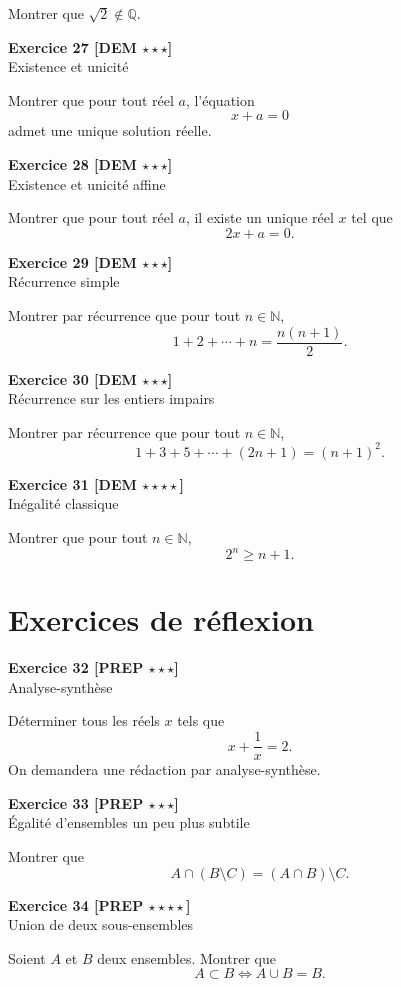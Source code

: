 \documentclass[11pt,a4paper]{article}
\newcommand{\N}{\mathbb{N}}
\newcommand{\Q}{\mathbb{Q}}
\begin{document}
Montrer que \(\sqrt{2}\notin \Q\).

\textbf{Exercice 27 [DEM \(\star\star\star\)]}\\
Existence et unicité

Montrer que pour tout réel \(a\), l’équation
\[
x+a=0
\]
admet une unique solution réelle.

\textbf{Exercice 28 [DEM \(\star\star\star\)]}\\
Existence et unicité affine

Montrer que pour tout réel \(a\), il existe un unique réel \(x\) tel que
\[
2x+a=0.
\]

\textbf{Exercice 29 [DEM \(\star\star\star\)]}\\
Récurrence simple

Montrer par récurrence que pour tout \(n\in\N\),
\[
1+2+\cdots+n=\frac{n(n+1)}{2}.
\]

\textbf{Exercice 30 [DEM \(\star\star\star\)]}\\
Récurrence sur les entiers impairs

Montrer par récurrence que pour tout \(n\in\N\),
\[
1+3+5+\cdots+(2n+1)=(n+1)^2.
\]

\textbf{Exercice 31 [DEM \(\star\star\star\star\)]}\\
Inégalité classique

Montrer que pour tout \(n\in\N\),
\[
2^n\geq n+1.
\]

\section*{Exercices de réflexion}

\textbf{Exercice 32 [PREP \(\star\star\star\)]}\\
Analyse-synthèse

Déterminer tous les réels \(x\) tels que
\[
x+\frac{1}{x}=2.
\]
On demandera une rédaction par analyse-synthèse.

\textbf{Exercice 33 [PREP \(\star\star\star\)]}\\
Égalité d’ensembles un peu plus subtile

Montrer que
\[
A\cap(B\setminus C)=(A\cap B)\setminus C.
\]

\textbf{Exercice 34 [PREP \(\star\star\star\star\)]}\\
Union de deux sous-ensembles

Soient \(A\) et \(B\) deux ensembles. Montrer que
\[
A\subset B \Longleftrightarrow A\cup B=B.
\]
\end{document}
